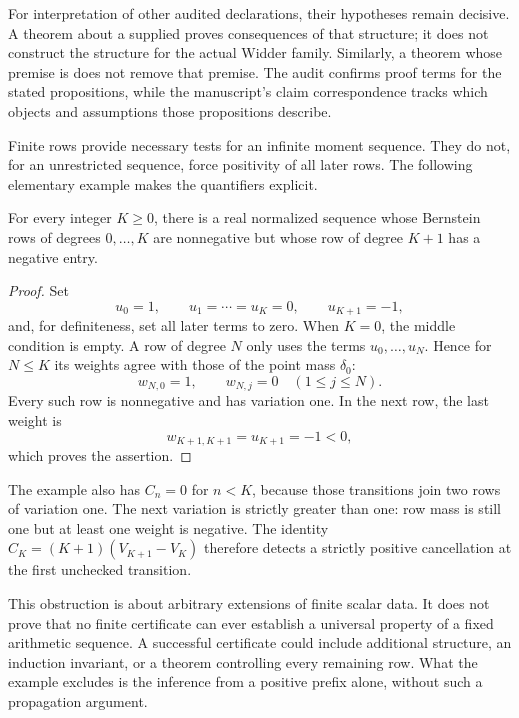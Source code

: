 For interpretation of other audited declarations, their hypotheses
remain decisive. A theorem about a supplied
 proves consequences of that structure;
it does not construct the structure for the actual Widder family.
Similarly, a theorem whose premise is
 does not remove that premise.
The audit confirms proof terms for the stated propositions, while
the manuscript's claim correspondence tracks which objects and
assumptions those propositions describe.

Finite rows provide necessary tests for an infinite moment sequence.
They do not, for an unrestricted sequence, force positivity of all
later rows. The following elementary example makes the quantifiers
explicit.

\begin{proposition}\label{app:prefix}
For every integer $K\ge0$, there is a real normalized sequence whose
Bernstein rows of degrees $0,\ldots,K$ are nonnegative but whose row
of degree $K+1$ has a negative entry.
\end{proposition}
\begin{proof}
Set
\[
 u_0=1,\qquad u_1=\cdots=u_K=0,\qquad u_{K+1}=-1,
\]
and, for definiteness, set all later terms to zero. When $K=0$,
the middle condition is empty. A row of degree $N$ only uses the
terms $u_0,\ldots,u_N$. Hence for $N\le K$ its weights agree with
those of the point mass $\delta_0$:
\[
 w_{N,0}=1,\qquad w_{N,j}=0\quad(1\le j\le N).
\]
Every such row is nonnegative and has variation one. In the next
row, the last weight is
\[
 w_{K+1,K+1}=u_{K+1}=-1<0,
\]
which proves the assertion.
\end{proof}
The example also has $C_n=0$ for $n<K$, because those transitions
join two rows of variation one. The next variation is strictly
greater than one: row mass is still one but at least one weight is
negative. The identity $C_K=(K+1)(V_{K+1}-V_K)$ therefore detects a
strictly positive cancellation at the first unchecked transition.

This obstruction is about arbitrary extensions of finite scalar data.
It does not prove that no finite certificate can ever establish a
universal property of a fixed arithmetic sequence. A successful
certificate could include additional structure, an induction
invariant, or a theorem controlling every remaining row. What the
example excludes is the inference from a positive prefix alone,
without such a propagation argument.

